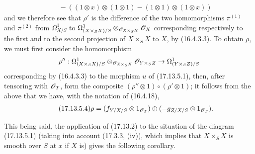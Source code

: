 \begin{env}[17.13.5]
\[\begin{split}
&\quad-((1\otimes x)\otimes(1\otimes1)-(1\otimes1)\otimes(1\otimes x))
\end{split}
\]
and we therefore see that $\rho'$ is the difference of the two homomorphisms $\pi^{(1)}$ and $\pi^{(2)}$ from $\Omega^1_{X/S}$ to $\Omega^1_{(X\times_SX)/S}\otimes_{\mathscr{O}_{X\times_SX}}\mathscr{O}_X$ corresponding respectively to the first and to the second projection of $X\times_SX$ to $X$, by (16.4.3.3). To obtain $\rho$, we must first consider the homomorphism
\[
\rho'':\Omega^1_{(X\times_SX)/S}\otimes_{\mathscr{O}_{X\times_SX}}\mathscr{O}_{Y\times_SZ}\to\Omega^1_{(Y\times_SZ)/S}
\]
corresponding by (16.4.3.3) to the morphism $u$ of (17.13.5.1), then, after tensoring with $\mathscr{O}_T$, form the composite $(\rho''\otimes1)\circ(\rho'\otimes1)$; it follows from the above that we have, with the notation of (16.4.18),
\[
\label{IV.17.13.5.4}
\tag{17.13.5.4}
\rho=(f_{Y/X/S}\otimes1_{\mathscr{O}_T})\oplus(-g_{Z/X/S}\otimes1_{\mathscr{O}_T}).
\]


This being said, the application of (17.13.2) to the situation of the diagram (17.13.5.1) (taking into account (17.3.3, (iv)), which implies that $X\times_SX$ is smooth over $S$ at $x$ if $X$ is) gives the following corollary.
\end{env}

